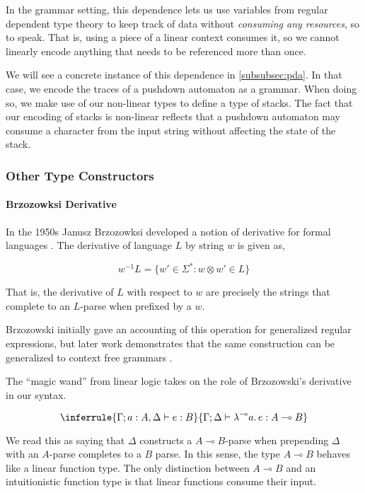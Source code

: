 \documentclass[acmsmall,screen,nonacm]{acmart}
\newcommand{\lto}{\multimap}
\newcommand{\String}{\Sigma^{*}}
\newcommand{\lamblto}[2]{\lambda^{{\lto}} #1.\, #2}
\begin{document}
In the grammar setting, this dependence lets
us use variables from regular dependent type theory to
keep track of data without \emph{consuming any resources}, so to speak. That is,
using a piece of a linear context consumes it, so we cannot linearly encode anything that
needs to be referenced more than once.

We will see a concrete instance of this dependence in \cref{subsubsec:pda}. In
that case, we encode the traces of a pushdown automaton as a grammar. When doing so,
we make use of our non-linear types to define a type of stacks. The fact that
our encoding of stacks is non-linear reflects
that a pushdown automaton may consume a character from the input string without
affecting the state of the stack.

\subsubsection{Other Type Constructors}
\label{subsubsec:other}

\paragraph{Brzozowksi Derivative}
In the 1950s Janusz Brzozowksi developed a notion of derivative for formal
languages \cite{brzozowskiDerivativesRegularExpressions1964}. The derivative of language $L$ by string $w$ is given as,

\[
  w^{-1}L = \{ w' \in \String : w \otimes w' \in L \}
\]

That is, the derivative of $L$ with respect to $w$ are precisely the strings
that complete to an $L$-parse when prefixed by a $w$.

Brzozowski initially gave an accounting of this operation for
generalized regular expressions, but later work demonstrates that the same
construction can be generalized to context free grammars \cite{mightParsingDerivativesFunctional2011}.

The ``magic wand'' from linear logic takes on the role of Brzozowski's
derivative in our syntax.

\begin{equation}
  \label{eq:linfun}
\inferrule{\Gamma ; a : A, \Delta \vdash e : B}{\Gamma ; \Delta \vdash \lamblto a e : A \lto B}
\end{equation}

We read this as saying that $\Delta$ constructs a $A \lto B$-parse when
prepending $\Delta$ with an $A$-parse completes to a $B$ parse. In this sense,
the type $A \lto B$ behaves like a linear function type. The only distinction
between $A \lto B$ and an intuitionistic function type is that linear functions
consume their input.
\end{document}

